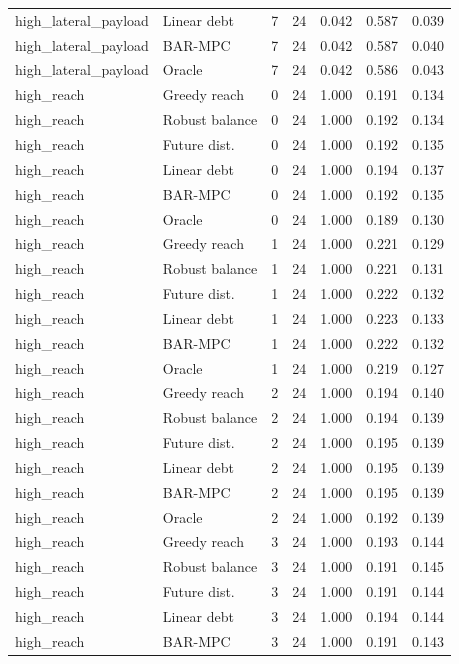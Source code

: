 \begin{longtable}{llrrrrr}
high\_lateral\_payload & Linear debt & 7 & 24 & 0.042 & 0.587 & 0.039 \\
high\_lateral\_payload & BAR-MPC & 7 & 24 & 0.042 & 0.587 & 0.040 \\
high\_lateral\_payload & Oracle & 7 & 24 & 0.042 & 0.586 & 0.043 \\
high\_reach & Greedy reach & 0 & 24 & 1.000 & 0.191 & 0.134 \\
high\_reach & Robust balance & 0 & 24 & 1.000 & 0.192 & 0.134 \\
high\_reach & Future dist. & 0 & 24 & 1.000 & 0.192 & 0.135 \\
high\_reach & Linear debt & 0 & 24 & 1.000 & 0.194 & 0.137 \\
high\_reach & BAR-MPC & 0 & 24 & 1.000 & 0.192 & 0.135 \\
high\_reach & Oracle & 0 & 24 & 1.000 & 0.189 & 0.130 \\
high\_reach & Greedy reach & 1 & 24 & 1.000 & 0.221 & 0.129 \\
high\_reach & Robust balance & 1 & 24 & 1.000 & 0.221 & 0.131 \\
high\_reach & Future dist. & 1 & 24 & 1.000 & 0.222 & 0.132 \\
high\_reach & Linear debt & 1 & 24 & 1.000 & 0.223 & 0.133 \\
high\_reach & BAR-MPC & 1 & 24 & 1.000 & 0.222 & 0.132 \\
high\_reach & Oracle & 1 & 24 & 1.000 & 0.219 & 0.127 \\
high\_reach & Greedy reach & 2 & 24 & 1.000 & 0.194 & 0.140 \\
high\_reach & Robust balance & 2 & 24 & 1.000 & 0.194 & 0.139 \\
high\_reach & Future dist. & 2 & 24 & 1.000 & 0.195 & 0.139 \\
high\_reach & Linear debt & 2 & 24 & 1.000 & 0.195 & 0.139 \\
high\_reach & BAR-MPC & 2 & 24 & 1.000 & 0.195 & 0.139 \\
high\_reach & Oracle & 2 & 24 & 1.000 & 0.192 & 0.139 \\
high\_reach & Greedy reach & 3 & 24 & 1.000 & 0.193 & 0.144 \\
high\_reach & Robust balance & 3 & 24 & 1.000 & 0.191 & 0.145 \\
high\_reach & Future dist. & 3 & 24 & 1.000 & 0.191 & 0.144 \\
high\_reach & Linear debt & 3 & 24 & 1.000 & 0.194 & 0.144 \\
high\_reach & BAR-MPC & 3 & 24 & 1.000 & 0.191 & 0.143 \\

\end{longtable}
